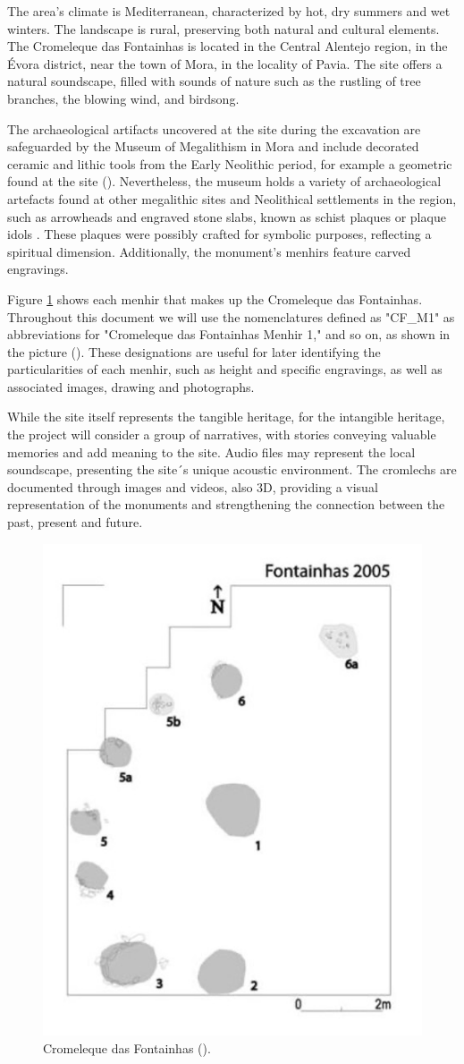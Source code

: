 \documentclass[10pt]{report}
\begin{document}
The area's climate is Mediterranean, characterized by hot, dry summers and wet winters. The landscape is rural, preserving both natural and cultural elements. The Cromeleque das Fontainhas is located in the Central Alentejo region, in the Évora district, near the town of Mora, in the locality of Pavia. The site offers a natural soundscape, filled with sounds of nature such as the rustling of tree branches, the blowing wind, and birdsong.

The archaeological artifacts uncovered at the site during the excavation are safeguarded by the Museum of Megalithism in Mora and include decorated ceramic and lithic tools from the Early Neolithic period, for example a geometric found at the site  (\cite{calado_neolitizacao_2007}). Nevertheless, the museum holds a variety of archaeological artefacts found at other megalithic sites and Neolithical settlements in the region, such as arrowheads and engraved stone slabs, known as schist plaques or plaque idols . These plaques were possibly crafted for symbolic purposes, reflecting a spiritual dimension. Additionally, the monument's menhirs feature carved engravings.


Figure \ref{fig:cat1} shows each menhir that makes up the Cromeleque das Fontainhas. Throughout this document we will  use the nomenclatures defined as "CF\_M1" as abbreviations for "Cromeleque das Fontainhas Menhir 1," and so on, as shown in the picture (\cite{calado_neolitizacao_2007}). These designations are useful for later identifying the particularities of each menhir, such as height and specific engravings, as well as associated images, drawing and photographs.

While the site itself represents the tangible heritage, for the intangible heritage, the project will consider a group  of narratives, with stories conveying valuable memories and add meaning to the site.  Audio files may represent the local soundscape, presenting the site´s unique acoustic environment. The cromlechs are documented through images and videos, also 3D, providing a visual representation of the monuments and strengthening the connection between the past, present and future.

\begin{figure}[!ht]
\centering
\includegraphics[width=0.4\linewidth]{figures/horseshoeimg.jpg}
\caption{\label{fig:cat1}Cromeleque das Fontainhas (\cite{calado_neolitizacao_2007}).}
\end{figure}
\end{document}
